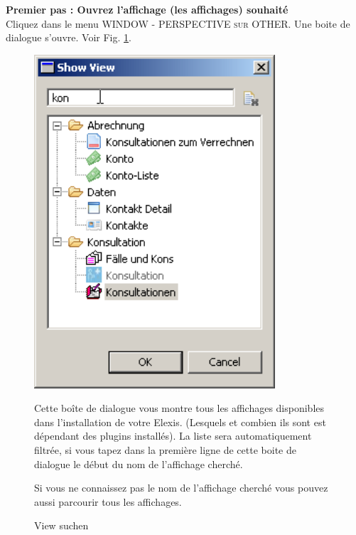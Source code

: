 \bigskip

\textbf{Premier pas : Ouvrez l'affichage (les affichages) souhaité}\\

Cliquez dans le menu  \textsc{WINDOW - PERSPECTIVE sur OTHER}. Une boite de dialogue s'ouvre. Voir Fig. \ref{fig:cust1}.\\

\begin{figure}[htbp]
   \begin{minipage}{0.4\textwidth}
       \centering
       \includegraphics[width=0.8\textwidth]{images/customize1}
       \caption{View suchen}
       \label{fig:cust1}
     \end{minipage}\hfill
     \begin{minipage}{0.5\textwidth}
        Cette boîte de dialogue vous montre tous les affichages disponibles dans l'installation de votre Elexis. (Lesquels et combien ils sont est dépendant des plugins installés). La liste sera automatiquement filtrée, si vous tapez dans la première ligne de cette boite de dialogue le début du nom de l'affichage cherché.

        Si vous ne connaissez pas le nom de l'affichage cherché vous pouvez aussi parcourir tous les affichages.

    \end{minipage}
\end{figure}

